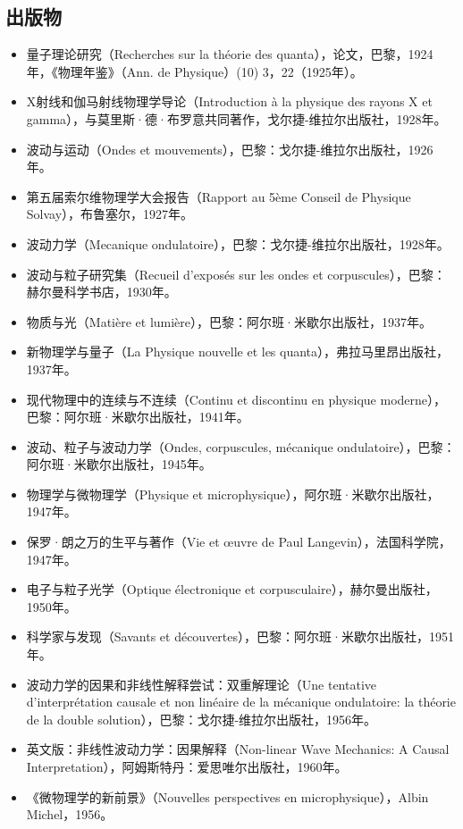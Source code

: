 \subsection{出版物}
\begin{itemize}
\item 量子理论研究（Recherches sur la théorie des quanta），论文，巴黎，1924年，《物理年鉴》（Ann. de Physique）(10) 3，22（1925年）。  
\item X射线和伽马射线物理学导论（Introduction à la physique des rayons X et gamma），与莫里斯·德·布罗意共同著作，戈尔捷-维拉尔出版社，1928年。  
\item 波动与运动（Ondes et mouvements），巴黎：戈尔捷-维拉尔出版社，1926年。  
\item 第五届索尔维物理学大会报告（Rapport au 5ème Conseil de Physique Solvay），布鲁塞尔，1927年。  
\item 波动力学（Mecanique ondulatoire），巴黎：戈尔捷-维拉尔出版社，1928年。  
\item 波动与粒子研究集（Recueil d'exposés sur les ondes et corpuscules），巴黎：赫尔曼科学书店，1930年。  
\item 物质与光（Matière et lumière），巴黎：阿尔班·米歇尔出版社，1937年。  
\item 新物理学与量子（La Physique nouvelle et les quanta），弗拉马里昂出版社，1937年。  
\item 现代物理中的连续与不连续（Continu et discontinu en physique moderne），巴黎：阿尔班·米歇尔出版社，1941年。  
\item 波动、粒子与波动力学（Ondes, corpuscules, mécanique ondulatoire），巴黎：阿尔班·米歇尔出版社，1945年。  
\item 物理学与微物理学（Physique et microphysique），阿尔班·米歇尔出版社，1947年。  
\item 保罗·朗之万的生平与著作（Vie et œuvre de Paul Langevin），法国科学院，1947年。  
\item 电子与粒子光学（Optique électronique et corpusculaire），赫尔曼出版社，1950年。  
\item 科学家与发现（Savants et découvertes），巴黎：阿尔班·米歇尔出版社，1951年。  
\item 波动力学的因果和非线性解释尝试：双重解理论（Une tentative d'interprétation causale et non linéaire de la mécanique ondulatoire: la théorie de la double solution），巴黎：戈尔捷-维拉尔出版社，1956年。  
\item 英文版：非线性波动力学：因果解释（Non-linear Wave Mechanics: A Causal Interpretation），阿姆斯特丹：爱思唯尔出版社，1960年。
\item 《微物理学的新前景》（Nouvelles perspectives en microphysique），Albin Michel，1956。

\end{itemize}

